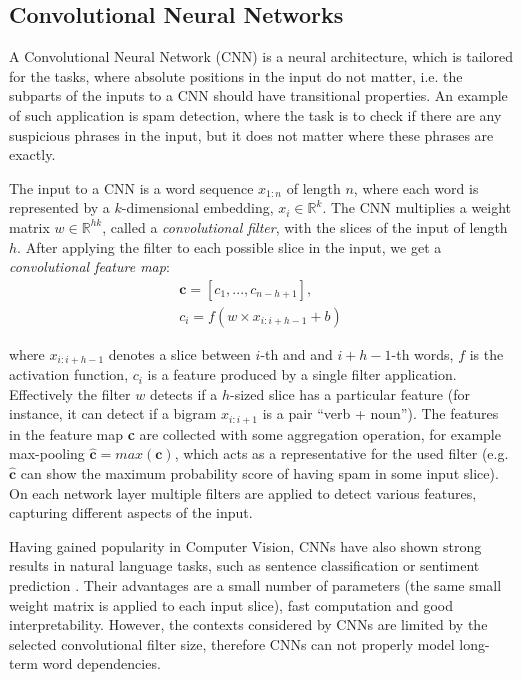 \subsection{Convolutional Neural Networks}

A Convolutional Neural Network (CNN) \cite{lecun1989backpropagation} is a neural architecture, which is tailored for the tasks, where absolute positions in the input do not matter, i.e. the subparts of the inputs to a CNN should have transitional properties. An example of such application is spam detection, where the task is to check if there are any suspicious phrases in the input, but it does not matter where these phrases are exactly. 

The input to a CNN is a word sequence $x_{1:n}$ of length $n$, where each word is represented by a $k$-dimensional embedding, $x_i \in \mathbb{R}^k$. The CNN multiplies a weight matrix $w \in \mathbb{R}^{hk}$, called a \textit{convolutional filter}, with the slices of the input of length $h$. After applying the filter to each possible slice in the input, we get a \textit{convolutional feature map}:
\begin{gather*}
    \textbf{c} = [c_1, ..., c_{n-h+1}], \\
    c_i = f(w \times x_{i:i+h-1} + b)
\end{gather*}

where $x_{i:i+h-1}$ denotes a slice between $i$-th and and $i+h-1$-th words, $f$ is the activation function, $c_i$ is a feature produced by a single filter application. Effectively the filter $w$ detects if a $h$-sized slice has a particular feature (for instance, it can detect if a bigram $x_{i:i+1}$ is a pair ``verb + noun''). The features in the feature map \textbf{c} are collected with some aggregation operation, for example max-pooling $\hat{\textbf{c}} = max{(\textbf{c})}$, which acts as a representative for the used filter (e.g. $\hat{\textbf{c}}$ can show the maximum probability score of having spam in some input slice). On each network layer multiple filters are applied to detect various features, capturing different aspects of the input.

Having gained popularity in Computer Vision, CNNs have also shown strong results in natural language tasks, such as sentence classification or sentiment prediction \cite{kim-2014-convolutional, kalchbrenner2014convolutional, collobert2011natural}. Their advantages are a small number of parameters (the same small weight matrix is applied to each input slice), fast computation and good interpretability. However, the contexts considered by CNNs are limited by the selected convolutional filter size, therefore CNNs can not properly model long-term word dependencies.

